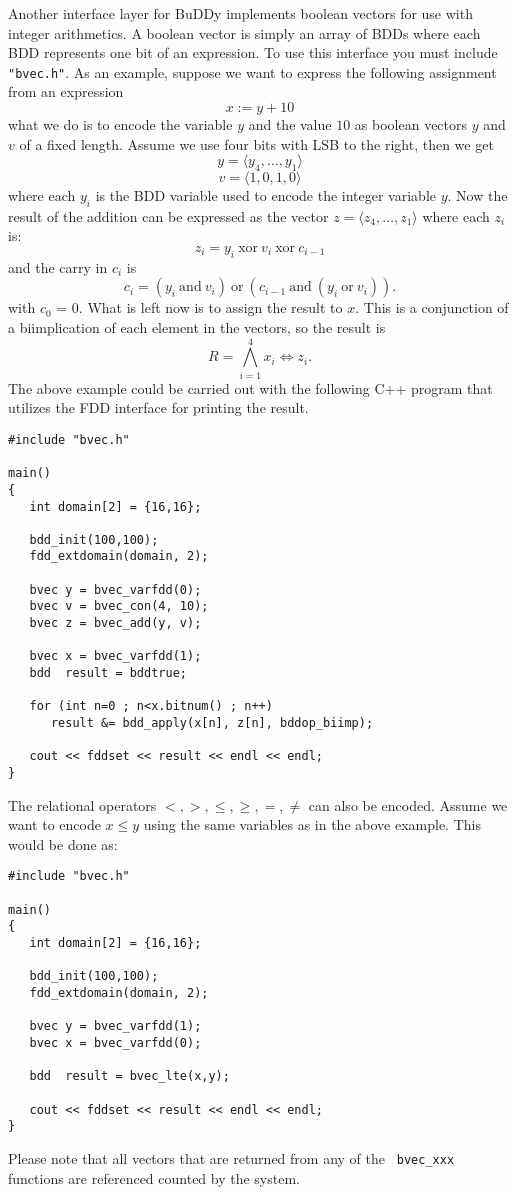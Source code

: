 \documentclass[a4paper,11pt,twoside,fleqn,openright]{report}
\newcommand{\tuple}[1] {\langle#1\rangle}
\begin{document}
 Another interface layer for BuDDy implements
boolean vectors for use with integer arithmetics. A boolean vector is
simply an array of BDDs where each BDD represents one bit of an
expression. To use this interface you must include {\tt "bvec.h"}. As
an example, suppose we want to express the following assignment from
an expression
\[
  x := y + 10
\]
 what we do is to encode the variable $y$ and the
value $10$ as boolean vectors $y$ and $v$ of a fixed length. Assume we
use four bits with LSB to the right, then we get
\[
  y = \tuple{y_4, \ldots, y_1}
\]
\[
  v = \tuple{1,0,1,0}
\]
where each $y_i$ is the BDD variable used to encode the integer
variable $y$. Now the result of the addition can be expressed as the
vector $z = \tuple{z_4, \ldots, z_1}$ where each $z_i$ is:
\[
  z_i = y_i\ \mbox{xor}\ v_i\ \mbox{xor}\ c_{i-1}
\]
and the carry in $c_i$ is
\[
  c_i = (y_i\ \mbox{and}\ v_i)\ \mbox{or}\ (c_{i-1}\ \mbox{and}
        \ (y_i\ \mbox{or}\ v_i)).
\]
with $c_0$ = 0. What is left now is to assign the result to $x$. This
is a conjunction of a biimplication of each element in the vectors, so
the result is
\[
  R = \bigwedge_{i=1}^4 x_i \Leftrightarrow z_i.
\]
The above example could be carried out with the following C++ program
that utilizes the FDD interface for printing the result.
\begin{verbatim}
#include "bvec.h"

main()
{
   int domain[2] = {16,16};

   bdd_init(100,100);
   fdd_extdomain(domain, 2);

   bvec y = bvec_varfdd(0);
   bvec v = bvec_con(4, 10);
   bvec z = bvec_add(y, v);

   bvec x = bvec_varfdd(1);
   bdd  result = bddtrue;
   
   for (int n=0 ; n<x.bitnum() ; n++)
      result &= bdd_apply(x[n], z[n], bddop_biimp);

   cout << fddset << result << endl << endl;
}
\end{verbatim}

\noindent
The relational operators $<,>,\leq,\geq,=,\neq$ can also be
encoded. Assume we want to encode $x \leq y$ using the same
variables as in the above example. This would be done as:
\begin{verbatim}
#include "bvec.h"

main()
{
   int domain[2] = {16,16};

   bdd_init(100,100);
   fdd_extdomain(domain, 2);

   bvec y = bvec_varfdd(1);
   bvec x = bvec_varfdd(0);

   bdd  result = bvec_lte(x,y);

   cout << fddset << result << endl << endl;
}
\end{verbatim}
%
Please note that all vectors that are returned from any of the {\tt
  bvec\_xxx} functions are referenced counted by the system.
\end{document}

